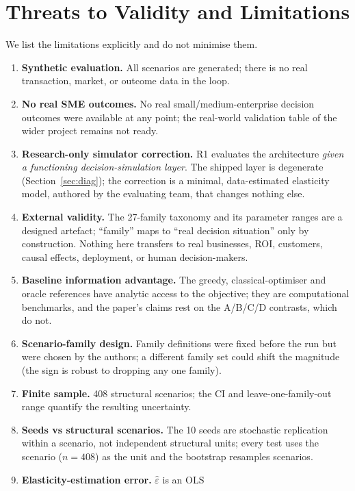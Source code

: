 \documentclass[10pt,twocolumn,a4paper]{article}
\begin{document}
\section{Threats to Validity and Limitations}\label{sec:threats}
We list the limitations explicitly and do not minimise them.
\begin{enumerate}
  \item \textbf{Synthetic evaluation.} All scenarios are generated; there is no
        real transaction, market, or outcome data in the loop.
  \item \textbf{No real SME outcomes.} No real small/medium-enterprise decision
        outcomes were available at any point; the real-world validation table of
        the wider project remains not ready.
  \item \textbf{Research-only simulator correction.} R1 evaluates the
        architecture \emph{given a functioning decision-simulation layer}. The
        shipped layer is degenerate (Section~\ref{sec:diag}); the correction is
        a minimal, data-estimated elasticity model, authored by the evaluating
        team, that changes nothing else.
  \item \textbf{External validity.} The 27-family taxonomy and its parameter
        ranges are a designed artefact; ``family'' maps to ``real decision
        situation'' only by construction. Nothing here transfers to real
        businesses, ROI, customers, causal effects, deployment, or human
        decision-makers.
  \item \textbf{Baseline information advantage.} The greedy, classical-optimiser
        and oracle references have analytic access to the objective; they are
        computational benchmarks, and the paper's claims rest on the A/B/C/D
        contrasts, which do not.
  \item \textbf{Scenario-family design.} Family definitions were fixed before
        the run but were chosen by the authors; a different family set could
        shift the magnitude (the sign is robust to dropping any one family).
  \item \textbf{Finite sample.} 408 structural scenarios; the CI and
        leave-one-family-out range quantify the resulting uncertainty.
  \item \textbf{Seeds vs structural scenarios.} The 10 seeds are stochastic
        replication within a scenario, not independent structural units; every
        test uses the scenario ($n=408$) as the unit and the bootstrap resamples
        scenarios.
  \item \textbf{Elasticity-estimation error.} $\hat\varepsilon$ is an OLS

\end{enumerate}
\end{document}
